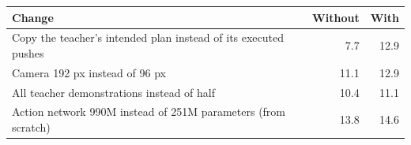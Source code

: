 
\begin{tabular}{lrr}
\toprule
Change & Without & With \\
\midrule
Copy the teacher's intended plan instead of its executed pushes & 7.7 & 12.9 \\
Camera 192 px instead of 96 px & 11.1 & 12.9 \\
All teacher demonstrations instead of half & 10.4 & 11.1 \\
Action network 990M instead of 251M parameters (from scratch) & 13.8 & 14.6 \\
\bottomrule
\end{tabular}
